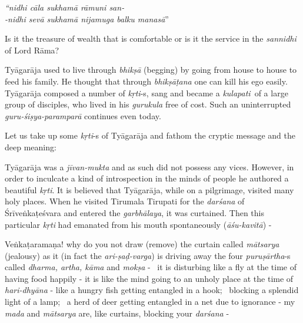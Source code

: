 \begin{longquote}
\textit{“nidhi cāla sukhamā rāmuni san-}\\ \textit{-nidhi sevā sukhamā nijamuga balku manasā}”
\end{longquote}

Is it the treasure of wealth that is comfortable or is it the service in the \textit{sannidhi} of Lord Rāma?

Tyāgarāja used to live through \textit{bhikṣā} (begging) by going from house to house to feed his family. He thought that through \textit{bhikṣāṭana} one can kill his ego easily. Tyāgarāja composed a number of \textit{kṛti}-s, sang and became a \textit{kulapati} of a large group of disciples, who lived in his \textit{gurukula} free of cost. Such an uninterrupted \textit{guru-śiṣya-paramparā} continues even today. 

\newpage

Let us take up some \textit{kṛti}-s of Tyāgarāja and fathom the cryptic message and the deep meaning: 

Tyāgarāja was a \textit{jīvan-mukta} and as such did not possess any vices. However, in order to inculcate a kind of introspection in the minds of people he authored a beautiful \textit{kṛti}. It is believed that Tyāgarāja, while on a pilgrimage, visited many holy places. When he visited Tirumala Tirupati for the \textit{darśana} of Śrīveṅkaṭeśvara and entered the \textit{garbhālaya}, it was curtained. Then this particular \textit{kṛti} had emanated from his mouth spontaneously (\textit{āśu-kavitā}) -

Veṅkaṭaramaṇa! why do you not draw (remove) the curtain called \textit{mātsarya} (jealousy) as it (in fact the \textit{ari-ṣaḍ-varga}) is driving away the four \textit{puruṣārtha}-s called \textit{dharma, artha, kāma} and \textit{mokṣa} -  it is disturbing like a fly at the time of having food happily - it is like the mind going to an unholy place at the time of \textit{hari-dhyāna} - like a hungry fish getting entangled in a hook;  blocking a splendid light of a lamp;  a herd of deer getting entangled in a net due to ignorance - my \textit{mada} and \textit{mātsarya} are, like curtains, blocking your \textit{darśana} -  

